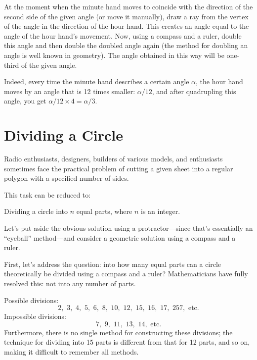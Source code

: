 At the moment when the minute hand moves to coincide with the direction of the second side of the given angle (or move it manually), draw a ray from the vertex of the angle in the direction of the hour hand. This creates an angle equal to the angle of the hour hand’s movement. Now, using a compass and a ruler, double this angle and then double the doubled angle again (the method for doubling an angle is well known in geometry). The angle obtained in this way will be one-third of the given angle.

Indeed, every time the minute hand describes a certain angle \( \alpha \), the hour hand moves by an angle that is 12 times smaller: \( \alpha/12 \), and after quadrupling this angle, you get \( \alpha/12 \times 4 = \alpha/3 \).



\section{Dividing a Circle}

Radio enthusiasts, designers, builders of various models, and enthusiasts sometimes face the practical problem of cutting a given sheet into a regular polygon with a specified number of sides.

This task can be reduced to:

Dividing a circle into \( n \) equal parts, where \( n \) is an integer.



Let's put aside the obvious solution using a protractor—since that's essentially an ``eyeball'' method—and consider a geometric solution using a compass and a ruler.

First, let's address the question: into how many equal parts can a circle theoretically be divided using a compass and a ruler? Mathematicians have fully resolved this: not into any number of parts.

Possible divisions: 
\begin{equation*}%
2,\,\, 3, \,\, 4, \,\, 5, \,\, 6, \,\, 8, \,\, 10,  \,\, 12, \,\, 15, \,\, 16, \,\, 17, \,\,  257, \,\, \text{etc.}
\end{equation*}
Impossible divisions: 
\begin{equation*}%
7,\,\, 9, \,\, 11, \,\, 13, \,\, 14, \,\, \text{etc.}
\end{equation*}
Furthermore, there is no single method for constructing these divisions; the technique for dividing into 15 parts is different from that for 12 parts, and so on, making it difficult to remember all methods.

